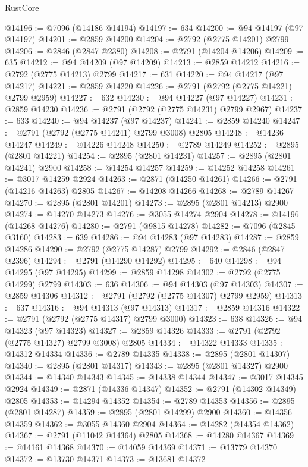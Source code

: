 \begin{lexlean}{RustCore}
\begin{coremodule}
@14196 := @7096 (@14186 @14194)
@14197 := 634
@14200 := @94 @14197 (@97 @14197)
@14201 := @2859 @14200
@14204 := @2792 (@2775 @14201) @2799
@14206 := @2846 (@2847 @2380)
@14208 := @2791 (@14204 @14206)
@14209 := 635
@14212 := @94 @14209 (@97 @14209)
@14213 := @2859 @14212
@14216 := @2792 (@2775 @14213) @2799
@14217 := 631
@14220 := @94 @14217 (@97 @14217)
@14221 := @2859 @14220
@14226 := @2791 (@2792 (@2775 @14221) @2799 @2959)
@14227 := 632
@14230 := @94 @14227 (@97 @14227)
@14231 := @2859 @14230
@14236 := @2791 (@2792 (@2775 @14231) @2799 @2967)
@14237 := 633
@14240 := @94 @14237 (@97 @14237)
@14241 := @2859 @14240
@14247 := @2791 (@2792 (@2775 @14241) @2799 @3008) @2805
@14248 := @14236 @14247
@14249 := @14226 @14248
@14250 := @2789 @14249
@14252 := @2895 (@2801 @14221)
@14254 := @2895 (@2801 @14231)
@14257 := @2895 (@2801 @14241) @2900
@14258 := @14254 @14257
@14259 := @14252 @14258
@14261 := @3017 @14259 @2924
@14263 := @2871 (@14250 @14261)
@14266 := @2791 (@14216 @14263) @2805
@14267 := @14208 @14266
@14268 := @2789 @14267
@14270 := @2895 (@2801 @14201)
@14273 := @2895 (@2801 @14213) @2900
@14274 := @14270 @14273
@14276 := @3055 @14274 @2904
@14278 := @14196 (@14268 @14276)
@14280 := @2791 (@9815 @14278)
@14282 := @7096 (@2845 @3160)
@14283 := 639
@14286 := @94 @14283 (@97 @14283)
@14287 := @2859 @14286
@14290 := @2792 (@2775 @14287) @2799
@14292 := @2846 (@2847 @2396)
@14294 := @2791 (@14290 @14292)
@14295 := 640
@14298 := @94 @14295 (@97 @14295)
@14299 := @2859 @14298
@14302 := @2792 (@2775 @14299) @2799
@14303 := 636
@14306 := @94 @14303 (@97 @14303)
@14307 := @2859 @14306
@14312 := @2791 (@2792 (@2775 @14307) @2799 @2959)
@14313 := 637
@14316 := @94 @14313 (@97 @14313)
@14317 := @2859 @14316
@14322 := @2791 (@2792 (@2775 @14317) @2799 @3000)
@14323 := 638
@14326 := @94 @14323 (@97 @14323)
@14327 := @2859 @14326
@14333 := @2791 (@2792 (@2775 @14327) @2799 @3008) @2805
@14334 := @14322 @14333
@14335 := @14312 @14334
@14336 := @2789 @14335
@14338 := @2895 (@2801 @14307)
@14340 := @2895 (@2801 @14317)
@14343 := @2895 (@2801 @14327) @2900
@14344 := @14340 @14343
@14345 := @14338 @14344
@14347 := @3017 @14345 @2924
@14349 := @2871 (@14336 @14347)
@14352 := @2791 (@14302 @14349) @2805
@14353 := @14294 @14352
@14354 := @2789 @14353
@14356 := @2895 (@2801 @14287)
@14359 := @2895 (@2801 @14299) @2900
@14360 := @14356 @14359
@14362 := @3055 @14360 @2904
@14364 := @14282 (@14354 @14362)
@14367 := @2791 (@11042 @14364) @2805
@14368 := @14280 @14367
@14369 := @14161 @14368
@14370 := @14059 @14369
@14371 := @13779 @14370
@14372 := @13730 @14371
@14373 := @13681 @14372

\end{coremodule}
\end{lexlean}
